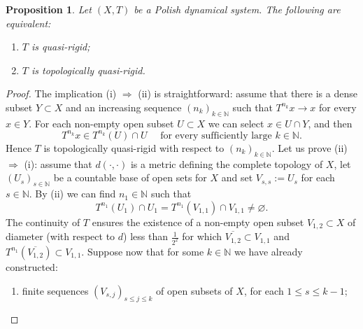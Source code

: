 \documentclass[openright,11pt]{article}
\theoremstyle{plain}
\newtheorem{proposition}[theorem]{Proposition}
\theoremstyle{definition}
\newcommand{\NN}{\mathbb{N}}
\newcommand{\cl}{\overline}
\begin{document}
\begin{proposition}\label{Pro:qr.complete}
	Let $(X,T)$ be a Polish dynamical system. The following are equivalent:
	\begin{enumerate}[{\em(i)}]
		\item $T$ is quasi-rigid;
		
		\item $T$ is topologically quasi-rigid.
	\end{enumerate}  
\end{proposition}
\begin{proof}
	The implication (i) $\Rightarrow$ (ii) is straightforward: assume that there is a dense subset $Y \subset X$ and an increasing sequence $(n_k)_{k\in\NN}$ such that $T^{n_k}x \to x$ for every $x \in Y$. For each non-empty open subset $U \subset X$ we can select $x \in U \cap Y$, and then
	\[
	T^{n_k}x \in T^{n_k}(U) \cap U \quad \text{ for every sufficiently large } k \in \NN.
	\]
	Hence $T$ is topologically quasi-rigid with respect to $(n_k)_{k\in\NN}$. Let us prove (ii) $\Rightarrow$ (i): assume that $d(\cdot,\cdot)$ is a metric defining the complete topology of $X$, let $(U_s)_{s\in\NN}$ be a countable base of open sets for $X$ and set $V_{s,s}:=U_s$ for each $s \in \NN$. By (ii) we can find $n_1 \in \NN$ such that
	\[
	T^{n_1}(U_1) \cap U_1 = T^{n_1}(V_{1,1}) \cap V_{1,1} \neq \varnothing.
	\]
	The continuity of $T$ ensures the existence of a non-empty open subset $V_{1,2} \subset X$ of diameter (with respect to $d$) less than $\frac{1}{2^2}$ for which $\cl{V_{1,2}} \subset V_{1,1}$ and $T^{n_1}\left(\cl{V_{1,2}}\right) \subset V_{1,1}$. Suppose now that for some $k \in \NN$ we have already constructed:
	\begin{enumerate}[--]
		\item finite sequences $(V_{s,j})_{s\leq j\leq k}$ of open subsets of $X$, for each $1\leq s\leq k-1$;
		

\end{enumerate}
\end{proof}
\end{document}
